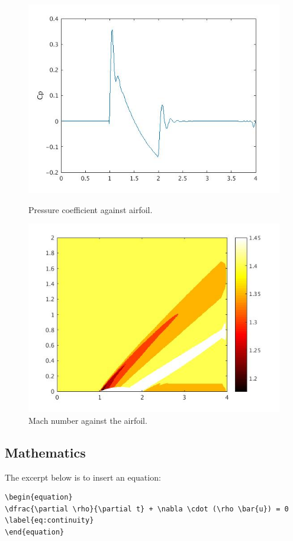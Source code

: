 \begin{figure}[!htbp]
\centering
\begin{minipage}[t]{0.48\textwidth} 
\includegraphics[width= \textwidth]{Figures/cp.jpg}
\caption{Pressure coefficient against airfoil.}
\label{fig:cp}
\end{minipage}
\begin{minipage}[t]{0.48\textwidth} 
\includegraphics[width= \textwidth]{Figures/machcontour.jpg}
\caption{Mach number against the airfoil.}
\label{fig:mach}
\end{minipage}
\end{figure}    

\newpage
\subsection{Mathematics}
The excerpt below is to insert an equation:
\begin{lstlisting}
\begin{equation}
\dfrac{\partial \rho}{\partial t} + \nabla \cdot (\rho \bar{u}) = 0
\label{eq:continuity}
\end{equation}
\end{lstlisting}

